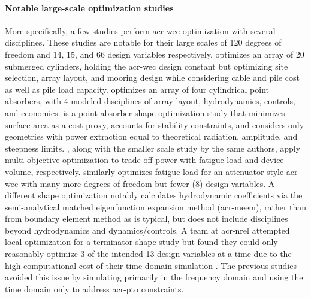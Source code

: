     \paragraph{Notable large-scale optimization studies}
    More specifically, a few studies \citep{gaudin_single_2021,khanal_multi-objective_2024,edwards_optimisation_2022,garcia-teruel_reliability-based_2021} perform \gls{acr-wec} optimization with several disciplines.
    These studies are notable for their large scales of 120 degrees of freedom and 14, 15, and 66 design variables respectively.
    \citet{gaudin_single_2021} optimizes an array of 20 submerged cylinders, holding the \gls{acr-wec} design constant but optimizing site selection, array layout, and mooring design while considering cable and pile cost as well as pile load capacity.
    \citet{khanal_multi-objective_2024} optimizes an array of four cylindrical point absorbers, with 4 modeled disciplines of array layout, hydrodynamics, controls, and economics.
    \citet{edwards_optimisation_2022} is a point absorber shape optimization study that minimizes surface area as a cost proxy, accounts for stability constraints, and considers only geometries with power extraction equal to theoretical radiation, amplitude, and steepness limits.
    \citet{garcia-teruel_reliability-based_2021}, along with the smaller scale study \citep{garcia-teruel_design_2022} by the same authors, apply multi-objective optimization to trade off power with fatigue load and device volume, respectively.
    \citet{cotten_multi-objective_2022} similarly optimizes fatigue load for an attenuator-style \gls{acr-wec} with many more degrees of freedom but fewer (8) design variables.
    A different shape optimization \citep{abdulkadir_control_2024} notably calculates hydrodynamic coefficients via the semi-analytical matched eigenfunction expansion method (\gls{acr-meem}), rather than from boundary element method as is typical, but does not include disciplines beyond hydrodynamics and dynamics/controls.
    A team at \gls{acr-nrel} attempted local optimization for a terminator shape study but found they could only reasonably optimize 3 of the intended 13 design variables at a time due to the high computational cost of their time-domain simulation \citep{housner_numerical_2024}.
    The previous studies \citet{garcia-teruel_reliability-based_2021,garcia-teruel_design_2022,cotten_multi-objective_2022} avoided this issue by simulating primarily in the frequency domain and using the time domain only to address \gls{acr-pto} constraints.

